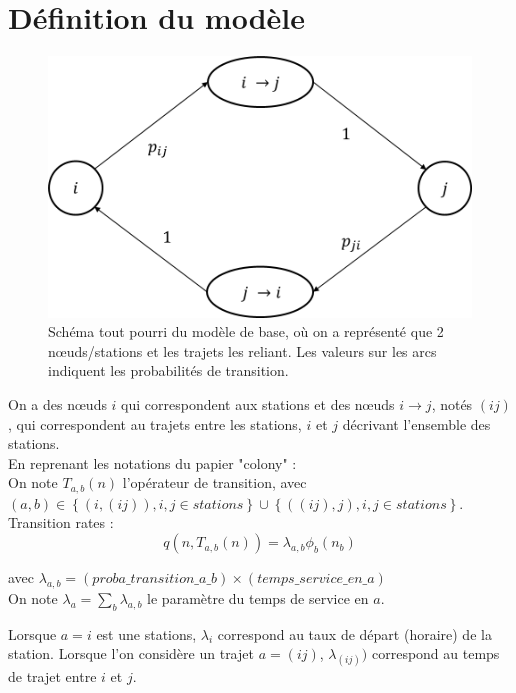 \documentclass[12pt,a4paper]{article}
\begin{document}
\thispagestyle{empty}
\newpage



\section{Définition du modèle}

\begin{figure}[h]
	\centering
	\includegraphics[width=0.6\linewidth]{img/modele.png}
	\caption{Schéma tout pourri du modèle de base, où on a représenté que 2 nœuds/stations et les trajets les reliant. Les valeurs sur les arcs indiquent les probabilités de transition.}
	\label{fig:1}
\end{figure}

On a des nœuds $i$ qui correspondent aux stations et des nœuds $i\rightarrow j$, notés $(ij)$, qui correspondent au trajets entre les stations, $i$ et $j$ décrivant l'ensemble des stations.\\

En reprenant les notations du papier "colony" :\\

On note $T_{a,b}(n)$ l'opérateur de transition, avec $(a,b) \in \left\{ \left(i,(ij)\right), i,j \in stations \right\} \cup \left\{ \left((ij),j\right), i,j \in stations \right\}$.\\


Transition rates :
\[
q\left(n, T_{a,b} (n) \right) = \lambda_{a,b} \phi_b(n_b)
\]

avec $\lambda_{a,b} = (proba\_transition\_a\_b) \times (temps\_service\_en\_a)$\\

On note $\lambda_a = \sum_b \lambda_{a,b}$ le paramètre du temps de service en $a$.

Lorsque $a = i$ est une stations, $\lambda_i$ correspond au taux de départ (horaire) de la station. Lorsque l'on considère un trajet $a = (ij)$, $\lambda_{(ij)})$ correspond au temps de trajet entre $i$ et $j$.\\
\end{document}
